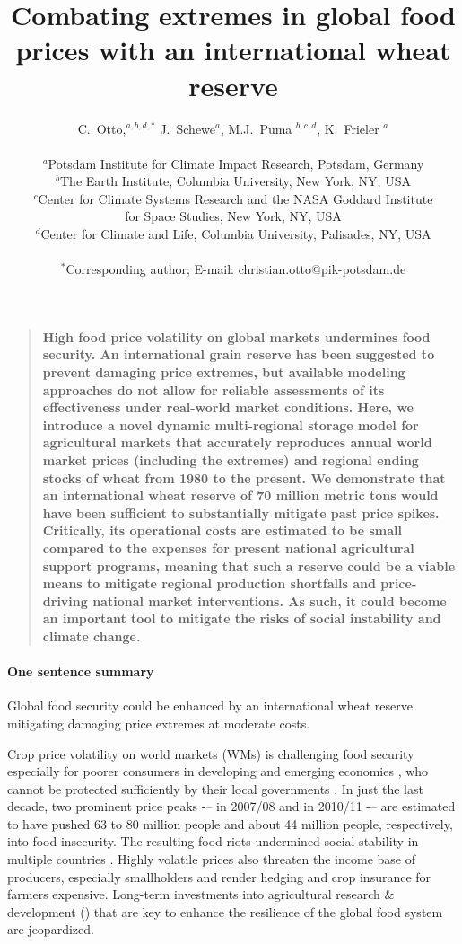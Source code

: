 \documentclass[12pt]{article}
\title{Combating extremes in global food prices with an international wheat reserve}
\author
{C.~Otto,$^{a,b,d,\ast}$ J.~Schewe$^{a}$, M.J.~Puma $^{b,c,d}$, K.~Frieler $^{a}$\\
  \\
  \normalsize{ $^{a}$Potsdam Institute for Climate Impact Research, Potsdam, Germany}\\
  \normalsize{ $^{b}$The Earth Institute, Columbia University, New York, NY, USA}\\
  \normalsize{ $^{c}$Center for Climate Systems Research and the NASA Goddard Institute}\\
  \normalsize{for Space Studies, New York, NY, USA}\\
  \normalsize{$^{d}$Center for Climate and Life, Columbia University, Palisades, NY, USA}\\
  \\
  \normalsize{$^\ast$Corresponding author; E-mail: christian.otto@pik-potsdam.de} }
\date{}
\newenvironment{sciabstract}{%
\begin{quote} \bf}
{\end{quote}}
\begin{document}
 


\baselineskip24pt


\maketitle 

\begin{sciabstract} %
High food price volatility on global markets undermines food security. An international grain reserve has been suggested to prevent damaging price extremes, but available modeling approaches do not allow for reliable assessments of its effectiveness under real-world market conditions. Here, we introduce a novel dynamic multi-regional storage model for agricultural markets that accurately reproduces annual world market prices (including the extremes) and regional ending stocks of wheat from 1980 to the present. We demonstrate that an international wheat reserve of 70 million metric tons would have been sufficient to substantially mitigate past price spikes. Critically, its operational costs are estimated to be small compared to the expenses for present national agricultural support programs, meaning that such a reserve could be a viable means to mitigate regional production shortfalls and price-driving national market interventions. As such, it could become an important tool to mitigate the risks of social instability and climate change.
\end{sciabstract}

\paragraph*{One sentence summary} %
Global food security could be enhanced by an international wheat reserve mitigating damaging price extremes at moderate costs.
\newline

Crop price volatility on world markets (WMs) is challenging food security especially for poorer consumers in developing and emerging economies \cite{BRA08}, who cannot be protected sufficiently by their local governments \cite{HLPE11}. In just the last decade, two prominent price peaks -– in 2007/08 and in 2010/11 -– are estimated to have pushed 63 \cite{TIW10} to 80 \cite{FAO08} million people and about 44 million people, respectively, into food insecurity. The resulting food riots undermined social stability in multiple countries \cite{BER13}. Highly volatile prices also threaten the income base of producers, especially smallholders \cite{HLPE11} and render hedging and crop insurance for farmers expensive. Long-term investments into agricultural research \& development (\RD) that are key to enhance the resilience of the global food system \cite{GOD10,FED10} are jeopardized.
\end{document}
